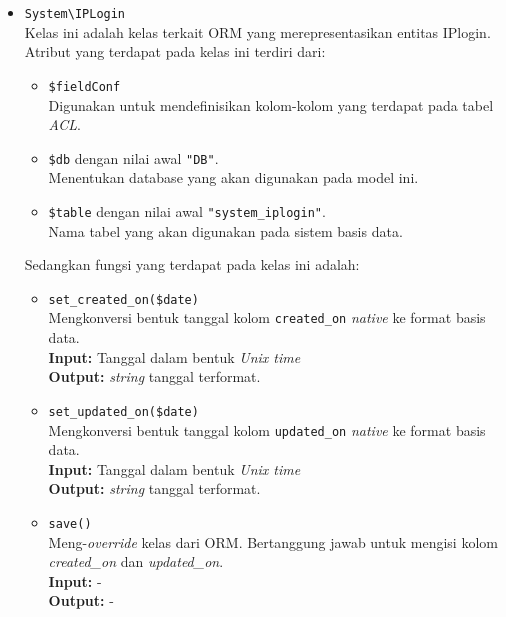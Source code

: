 \begin{itemize}
        \item \texttt{System\textbackslash IPLogin} \\
            Kelas ini adalah kelas terkait ORM yang merepresentasikan entitas
            IPlogin. Atribut yang terdapat pada kelas ini terdiri dari:
            \begin{itemize}
                \item \texttt{\$fieldConf} \\
                    Digunakan untuk mendefinisikan kolom-kolom yang terdapat
                    pada tabel \textit{ACL}.
                \item \texttt{\$db} dengan nilai awal \texttt{"DB"}. \\
                    Menentukan database yang akan digunakan pada model ini.
                \item \texttt{\$table} dengan nilai awal
                \texttt{"system\_iplogin"}. \\
                    Nama tabel yang akan digunakan pada sistem basis data. 
            \end{itemize}
            Sedangkan fungsi yang terdapat pada kelas ini adalah:
            \begin{itemize}
                \item \texttt{set\_created\_on(\$date)} \\
                    Mengkonversi bentuk tanggal kolom \texttt{created\_on}
                    \textit{native} ke format basis data. \\
                    \textbf{Input:} Tanggal dalam bentuk \textit{Unix time}\\
                    \textbf{Output:} \textit{string} tanggal terformat.
                
                \item \texttt{set\_updated\_on(\$date)} \\
                    Mengkonversi bentuk tanggal kolom \texttt{updated\_on}
                    \textit{native} ke format basis data. \\
                    \textbf{Input:} Tanggal dalam bentuk \textit{Unix time}\\
                    \textbf{Output:} \textit{string} tanggal terformat.
                
                \item \texttt{save()}\\
                    Meng-\textit{override} kelas dari ORM. Bertanggung jawab
                    untuk mengisi kolom \textit{created\_on} dan
                    \textit{updated\_on}.\\
                    \textbf{Input:} -\\
                    \textbf{Output:} -
            \end{itemize}
    \end{itemize}
    
